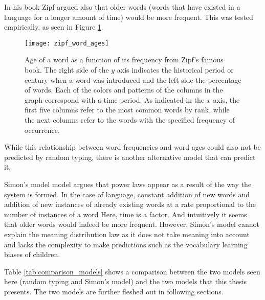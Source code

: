 In his book \cite{Zipf1949a} Zipf argued also that older words (words that have existed in a language for a longer amount of time) would be more frequent.
This was tested empirically, as seen in Figure \ref{fig:zipf_word_ages}.

\begin{figure}
  \centering
  \texttt{[image: zipf\_word\_ages]}
  \caption{
    Age of a word as a function of its frequency from Zipf's famous book. \cite{Zipf1949a}
    The right side of the $y$ axis indicates the historical period or century when a word was introduced and the left side the percentage of words.
    Each of the colors and patterns of the columns in the graph correspond with a time period.
    As indicated in the $x$ axis, the first five columns refer to the most common words by rank, while the next columns refer to the words with the specified frequency of occurrence.
  }
  \label{fig:zipf_word_ages}
\end{figure}

While this relationship between word frequencies and word ages could also not be predicted by random typing, there is another alternative model that can predict it.

Simon's model \cite{Simon1955} model argues that power laws appear as a result of the way the system is formed.
In the case of language, constant addition of new words and addition of new instances of already existing words at a rate proportional to the number of instances of a word
Here, time is a factor. And intuitively it seems that older words would indeed be more frequent.
However, Simon's model cannot explain the meaning distribution law as it does not take meaning into account and lacks the complexity to make predictions such as the vocabulary learning biases of children.

Table \ref{tab:comparison_models} shows a comparison between the two models seen here (random typing and Simon's model) and the two models that this thesis presents.
The two models are further fleshed out in following sections.

